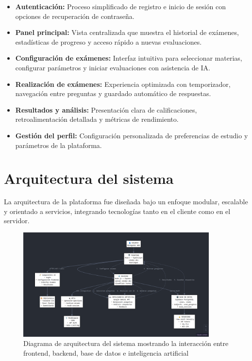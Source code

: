 \documentclass[12pt,a4paper]{report}
\begin{document}
\begin{itemize}
\item \textbf{Autenticación:} Proceso simplificado de registro e inicio de sesión con opciones de recuperación de contraseña.

\item \textbf{Panel principal:} Vista centralizada que muestra el historial de exámenes, estadísticas de progreso y acceso rápido a nuevas evaluaciones.

\item \textbf{Configuración de exámenes:} Interfaz intuitiva para seleccionar materias, configurar parámetros y iniciar evaluaciones con asistencia de IA.

\item \textbf{Realización de exámenes:} Experiencia optimizada con temporizador, navegación entre preguntas y guardado automático de respuestas.

\item \textbf{Resultados y análisis:} Presentación clara de calificaciones, retroalimentación detallada y métricas de rendimiento.

\item \textbf{Gestión del perfil:} Configuración personalizada de preferencias de estudio y parámetros de la plataforma.
\end{itemize}

\section{Arquitectura del sistema}

La arquitectura de la plataforma fue diseñada bajo un enfoque modular, escalable y orientado a servicios, integrando tecnologías tanto en el cliente como en el servidor.

\begin{figure}[h]
\centering
\includegraphics[width=0.9\textwidth]{assets/250617_06h33m59s_screenshot.png}
\caption{Diagrama de arquitectura del sistema mostrando la interacción entre frontend, backend, base de datos e inteligencia artificial}
\label{fig:arquitectura}
\end{figure}
\end{document}
